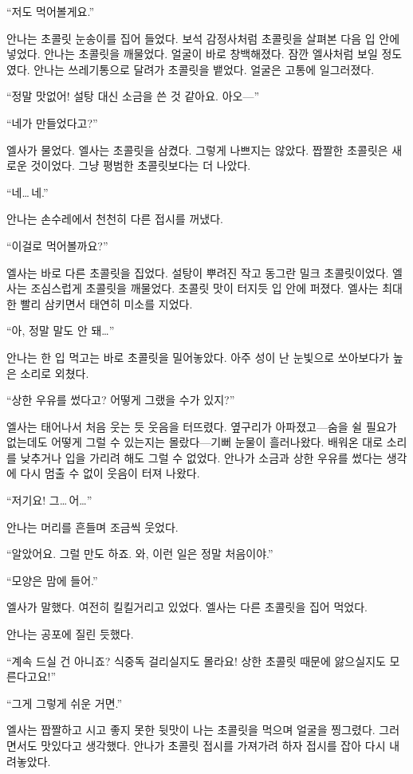 ``저도 먹어볼게요.''

안나는 초콜릿 눈송이를 집어 들었다. 보석 감정사처럼 초콜릿을 살펴본 다음 입 안에 넣었다. 안나는 초콜릿을 깨물었다. 얼굴이 바로 창백해졌다. 잠깐 엘사처럼 보일 정도였다. 안나는 쓰레기통으로 달려가 초콜릿을 뱉었다. 얼굴은 고통에 일그러졌다.

``정말 맛없어! 설탕 대신 소금을 쓴 것 같아요. 아오—''

``네가 만들었다고?''

엘사가 물었다. 엘사는 초콜릿을 삼켰다. 그렇게 나쁘지는 않았다. 짭짤한 초콜릿은 새로운 것이었다. 그냥 평범한 초콜릿보다는 더 나았다.

``네\ldots\,네.''

안나는 손수레에서 천천히 다른 접시를 꺼냈다.

``이걸로 먹어볼까요?''

엘사는 바로 다른 초콜릿을 집었다. 설탕이 뿌려진 작고 동그란 밀크 초콜릿이었다. 엘사는 조심스럽게 초콜릿을 깨물었다. 초콜릿 맛이 터지듯 입 안에 퍼졌다. 엘사는 최대한 빨리 삼키면서 태연히 미소를 지었다.

``아, 정말 말도 안 돼\ldots''

안나는 한 입 먹고는 바로 초콜릿을 밀어놓았다. 아주 성이 난 눈빛으로 쏘아보다가 높은 소리로 외쳤다.

``상한 우유를 썼다고? 어떻게 그랬을 수가 있지?''

엘사는 태어나서 처음 웃는 듯 웃음을 터뜨렸다. 옆구리가 아파졌고—숨을 쉴 필요가 없는데도 어떻게 그럴 수 있는지는 몰랐다—기뻐 눈물이 흘러나왔다. 배워온 대로 소리를 낮추거나 입을 가리려 해도 그럴 수 없었다. 안나가 소금과 상한 우유를 썼다는 생각에 다시 멈출 수 없이 웃음이 터져 나왔다.

``저기요! 그\ldots\,어\ldots''

안나는 머리를 흔들며 조금씩 웃었다.

``알았어요. 그럴 만도 하죠. 와, 이런 일은 정말 처음이야.''

``모양은 맘에 들어.''

엘사가 말했다. 여전히 킬킬거리고 있었다. 엘사는 다른 초콜릿을 집어 먹었다.

안나는 공포에 질린 듯했다.

``계속 드실 건 아니죠? 식중독 걸리실지도 몰라요! 상한 초콜릿 때문에 앓으실지도 모른다고요!''

``그게 그렇게 쉬운 거면.''

엘사는 짭짤하고 시고 좋지 못한 뒷맛이 나는 초콜릿을 먹으며 얼굴을 찡그렸다. 그러면서도 맛있다고 생각했다. 안나가 초콜릿 접시를 가져가려 하자 접시를 잡아 다시 내려놓았다.

